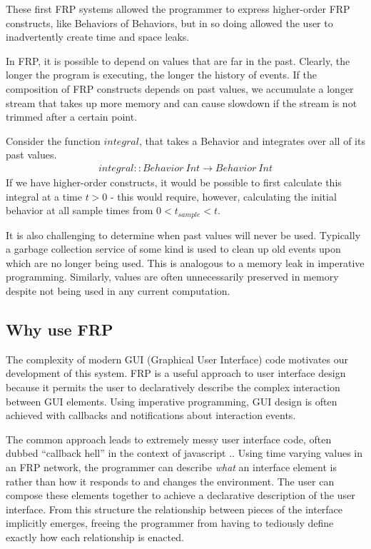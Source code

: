 \documentclass[twocolumn,11pt,english]{article}
\begin{document}
These first FRP systems allowed the programmer to express higher-order FRP constructs, like Behaviors of Behaviors, but in so doing allowed the user to inadvertently create time and space leaks. 

In FRP, it is possible to depend on values that are far in the past. Clearly, the longer the program is executing, the longer the history of events. If the composition of FRP constructs depends on past values, we accumulate a longer stream that takes up more memory and can cause slowdown if the stream is not trimmed after a certain point. 

Consider the function $integral$, that takes a Behavior and integrates over all of its past values. 
\begin{align*}
  integral :: Behavior~Int \rightarrow Behavior~Int
\end{align*}
If we have higher-order constructs, it would be possible to first calculate this integral at a time $t > 0$ - this would require, however, calculating the initial behavior at all sample times from $0 < t_{sample} < t$. 

It is also challenging to determine when past values will never be used. Typically a garbage collection service of some kind is used to clean up old events upon which are no longer being used. This is analogous to a memory leak in imperative programming. Similarly, values are often unnecessarily preserved in memory despite not being used in any current computation. 

\subsection{Why use FRP}
 The complexity of modern GUI (Graphical User Interface) code motivates our development of this system. FRP is a useful approach to user interface design because it permits the user to declaratively describe the complex interaction between GUI elements. Using imperative programming, GUI design is often achieved with callbacks and notifications about interaction events. 

The common approach leads to extremely messy user interface code, often dubbed ``callback hell'' in the context of javascript \cite{czaplicki2013asynchronous}.. 
Using time varying values in an FRP network, the programmer can describe \textit{what} an interface element is rather than how it responds to and changes the environment. The user can compose these elements together to achieve a declarative description of the user interface. From this structure the relationship between pieces of the interface implicitly emerges, freeing the programmer from having to tediously define exactly how each relationship is enacted.
\end{document}
